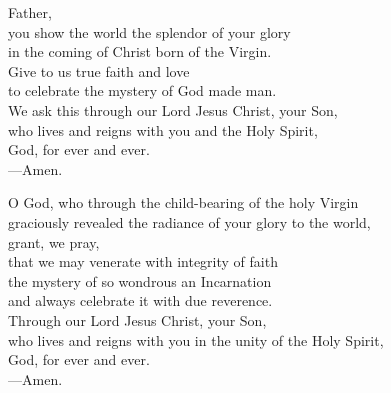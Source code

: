 \prayer


\begin{prayerverse}
Father,\\
you show the world the splendor of your glory\\
in the coming of Christ born of the Virgin.\\
Give to us true faith and love\\
to celebrate the mystery of God made man.\\
We ask this through our Lord Jesus Christ, your Son,\\
who lives and reigns with you and the Holy Spirit,\\
God, for ever and ever.\\
{\color{red}---\thinspace}Amen.
\end{prayerverse}


\begin{prayerverse}
O God, who through the child-bearing of the holy Virgin\\
graciously revealed the radiance of your glory to the world,\\
grant, we pray,\\
that we may venerate with integrity of faith\\
the mystery of so wondrous an Incarnation\\
and always celebrate it with due reverence.\\
Through our Lord Jesus Christ, your Son,\\
who lives and reigns with you in the unity of the Holy Spirit,\\
God, for ever and ever.\\
{\color{red}---\thinspace}Amen.

\end{prayerverse}

